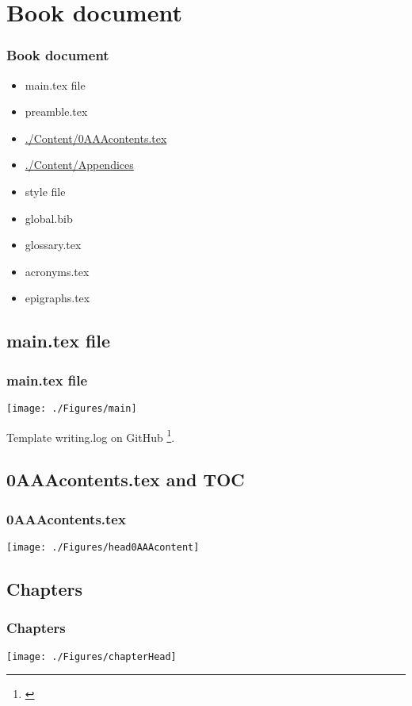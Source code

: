 \documentclass{beamer}
\begin{document}
\section{Book document}
\begin{frame}
\frametitle{Book document}
\begin{center}
\begin{itemize}
\item main.tex file
\item preamble.tex
\item \url{./Content/0AAAcontents.tex}
\item \url{./Content/Appendices}
\item style file
\item global.bib
\item glossary.tex
\item acronyms.tex
\item epigraphs.tex
\end{itemize}
\end{center}
\end{frame}


\subsection{main.tex file}
\begin{frame}
\frametitle{main.tex file}
\begin{center}
\begin{center}
    \texttt{[image: ./Figures/main]}
\end{center}
Template writing.log on GitHub \footnote{\url{}}.
\end{center}
\end{frame}
\note{}


\subsection{0AAAcontents.tex and TOC}
\begin{frame}
\frametitle{0AAAcontents.tex}
\begin{center}
\begin{center}
    \texttt{[image: ./Figures/head0AAAcontent]}
\end{center}
\end{center}
\end{frame}
\note{}

\subsection{Chapters}
\begin{frame}
\frametitle{Chapters}
\begin{center}
\begin{center}
    \texttt{[image: ./Figures/chapterHead]}
\end{center}
\end{center}
\end{frame}
\note{}
\end{document}
